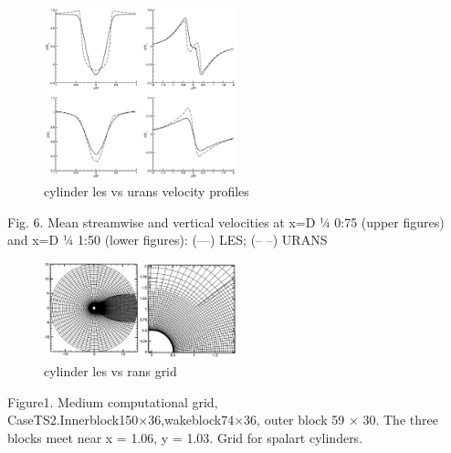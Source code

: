 \documentclass[journal]{new-aiaa}
\begin{document}
\begin{figure}[H]
\begin{center}
\includegraphics[width=0.5\textwidth]{Images/logan/catalano_2003numerical_VelocityProfiles.pdf}
\caption{ cylinder les vs urans velocity profiles \cite{catalano2003numerical} }
\label{fig:lesvsuranscylindervelprofile}
\end{center}
\end{figure}

Fig. 6. Mean streamwise and vertical velocities at x=D 1⁄4 0:75 (upper figures) and x=D 1⁄4 1:50 (lower figures): (—) LES; (– –) URANS




\begin{figure}[H]
\begin{center}
\includegraphics[width=0.5\textwidth]{Images/logan/travin2000detachededdy_grid.pdf}
\caption{ cylinder les vs rans grid \cite{travin2000detachededdy} }
\label{fig:lesvsranscylindergrid}
\end{center}
\end{figure}

Figure1. Medium computational grid, CaseTS2.Innerblock150×36,wakeblock74×36, outer block 59 × 30. The three blocks meet near x = 1.06, y = 1.03.  Grid for spalart cylinders.
\end{document}
